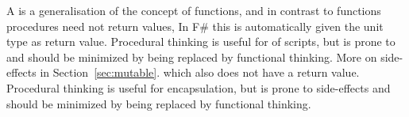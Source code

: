 A  is a generalisation of the concept of functions, and in contrast to functions procedures need not return values,
%
In F\# this is automatically given the unit type as return value. Procedural thinking is useful for  of scripts, but is prone to  and should be minimized by being replaced by functional thinking. More on side-effects in Section~\ref{sec:mutable}.
which also does not have a return value. Procedural thinking is useful for encapsulation, but is prone to side-effects and should be minimized by being replaced by functional thinking.


